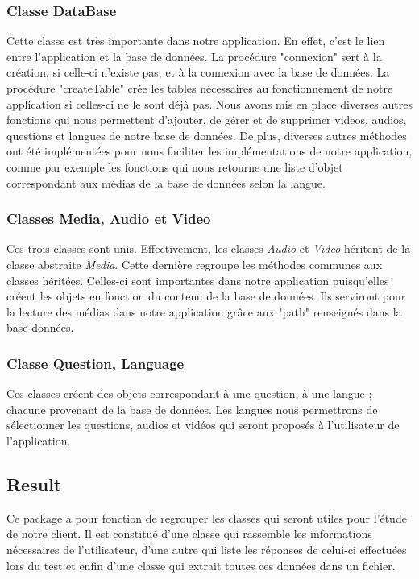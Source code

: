 \subsubsection{Classe DataBase}

Cette classe est très importante dans notre application. En effet, c'est le lien entre l'application et la base de données. La procédure "connexion" sert à la création, si celle-ci n'existe pas, et à la connexion avec la base de données. La procédure "createTable" crée les tables nécessaires au fonctionnement de notre application si celles-ci ne le sont déjà pas. Nous avons mis en place diverses autres fonctions qui nous permettent d'ajouter, de gérer et de supprimer videos, audios, questions et langues de notre base de données. De plus, diverses autres méthodes ont été implémentées pour nous faciliter les implémentations de notre application, comme par exemple les fonctions qui nous retourne une liste d'objet correspondant aux médias de la base de données selon la langue.

\subsubsection{Classes Media, Audio et Video}

Ces trois classes sont unis. Effectivement, les classes \textit{Audio} et \textit{Video} héritent de la classe abstraite \textit{Media}. Cette dernière regroupe les méthodes communes aux classes héritées. Celles-ci sont importantes dans notre application puisqu'elles créent les objets en fonction du contenu de la base de données. Ils serviront pour la lecture des médias dans notre application grâce aux "path" renseignés dans la base données.

\subsubsection{Classe Question, Language}

Ces classes créent des objets correspondant à une question, à une langue ; chacune provenant de la base de données. Les langues nous permettrons de sélectionner les questions, audios et vidéos qui seront proposés à l'utilisateur de l'application. 

\subsection{Result}

Ce package a pour fonction de regrouper les classes qui seront utiles pour l'étude de notre client. Il est constitué d'une classe qui rassemble les informations nécessaires de l'utilisateur, d'une autre qui liste les réponses de celui-ci effectuées lors du test et enfin d'une classe qui extrait toutes ces données dans un fichier.

